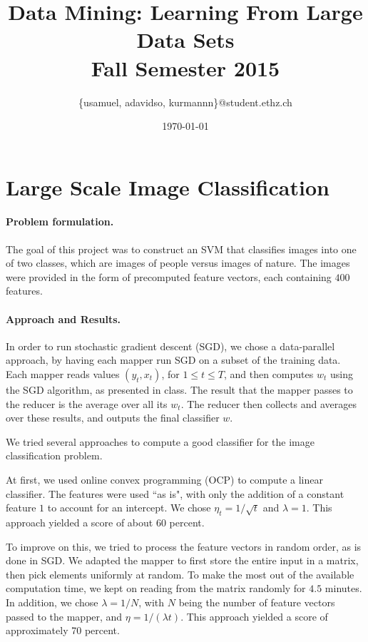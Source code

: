 \documentclass[a4paper, 11pt]{article}
\title{Data Mining: Learning From Large Data Sets\\\vspace{2mm}\Large{Fall Semester 2015}}
\author{\{usamuel, adavidso, kurmannn\}@student.ethz.ch}
\date{\today}
\begin{document}
\maketitle
\thispagestyle{empty}
\pagestyle{empty}

\section*{Large Scale Image Classification} 


\paragraph{Problem formulation.\!\!\!}
The goal of this project was to construct an SVM that classifies images into one of two classes, which are images of people versus images of nature. The images were provided in the form of precomputed feature vectors, each containing $400$ features.

\paragraph{Approach and Results.\!\!\!}
In order to run stochastic gradient descent (SGD), we chose a data-parallel approach, by having each mapper run SGD on a subset of the training data. 
	Each mapper reads values $(y_t,x_t)$, for $1\leq t\leq T$, and then computes $w_t$ using the SGD algorithm, as presented in class. The result that the mapper passes to the reducer is the average over 
all its $w_t$. The reducer then collects and averages over these results, and outputs the final classifier $w$.

We tried several approaches to compute a good classifier for the image classification problem.

At first, we used online convex programming (OCP) to compute a linear classifier. The features were used ``as is", with only the addition of a constant feature $1$ to account for an intercept. We chose $\eta_t=1/\sqrt{t}$ and $\lambda=1$. This approach yielded a score of about $60$ percent.

To improve on this, we tried to process the feature vectors in random order, as is done in SGD. We adapted the mapper to first store the entire input in a matrix, then pick elements uniformly at random. To make the most out of the available computation time, we kept on reading from the matrix randomly for $4.5$ minutes. In addition, we chose $\lambda=1/N$, with $N$ being the number of feature vectors passed to the mapper, and $\eta= 1/(\lambda t)$. 
This approach yielded a score of approximately 70 percent.
\end{document}
